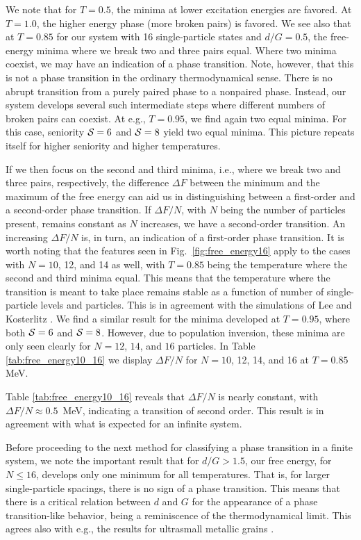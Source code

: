 \documentclass[rmp,preprint,aps,floatfix]{revtex4}
\begin{document}
We note that for $T=0.5$, the minima at lower excitation
energies are favored. 
At $T=1.0$, the higher energy
phase (more broken pairs) is favored.
We see also that at $T=0.85$ for our system with 
16 single-particle states and $d/G=0.5$,
the free-energy minima where we break two and three pairs 
equal. 
Where two minima coexist, we may have an
indication  of a phase transition. Note, however, that this is not a 
phase transition in the ordinary thermodynamical sense.
There is no abrupt transition from a purely paired phase to a 
nonpaired phase.  
Instead, our system develops several such intermediate steps
where different numbers of broken pairs can coexist. 
At e.g., $T=0.95$, we find again two equal minima. For this case,
seniority ${\cal S}=6$ and ${\cal S}=8$ yield two equal minima.
This picture repeats itself for higher seniority and higher temperatures.

If we then focus on the second and third minima, i.e., where we break
two and three pairs, respectively, the difference $\Delta F$ between the 
minimum and the maximum of the free energy can aid us in distinguishing
between a first-order and a second-order phase transition. If $\Delta F/N$,
with $N$ being the number of particles present, remains constant as $N$
increases, we have a second-order transition. An increasing $\Delta F/N$
is, in turn, an indication of a first-order phase transition. 
It is worth noting that the features
seen in Fig.~\ref{fig:free_energy16} apply to the cases with $N=10$, 12, 
and 14 as well, with $T=0.85$ being the temperature where the second and
third minima equal. This means that the temperature where the transition
is meant to take place remains stable as a function of number of single-particle
levels and particles. This is in agreement with the simulations of 
Lee and Kosterlitz \cite{lk90,lk91}. We find a similar result for the minima
developed at $T=0.95$, where both ${\cal S}=6$ and ${\cal S}=8$.
However, due to population inversion, these minima are only seen clearly
for $N=12$, $14$, and $16$ particles.
In Table \ref{tab:free_energy10_16} we display $\Delta F/N$ for 
$N=10$, 12, 14, and 16 at $T=0.85$ MeV. 

Table \ref{tab:free_energy10_16} reveals that $\Delta F/N$ is nearly
constant, with  $\Delta F/N\approx 0.5$~MeV, indicating a 
transition of second order. This result is in 
agreement with what is expected for an infinite system. 

Before proceeding to the next method for classifying a phase transition
in a finite system, we note the important result that for $d/G > 1.5$, 
our free energy, for $N\le 16$, develops
only one minimum for all temperatures. That is, for larger single-particle
spacings, there is no sign of a phase transition. This means that there
is a critical relation between $d$ and $G$ for the appearance of a phase 
transition-like behavior, being a  reminiscence of the thermodynamical limit.
This agrees also with e.g., the results for ultrasmall metallic grains
\cite{delft2000}. 
\end{document}
